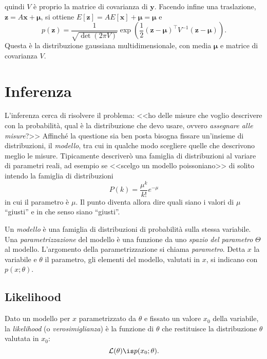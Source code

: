 %
quindi $V$ è proprio la matrice di covarianza di $\mathbf y$. Facendo infine
una traslazione, $\mathbf z = A\mathbf x + \boldsymbol\mu$, si ottiene
$E[\mathbf z] = AE[\mathbf x] + \boldsymbol\mu = \boldsymbol\mu$ e
%
\begin{equation*}
    p(\mathbf z) = \frac1{\sqrt{\det(2\pi V)}}
    \exp\left(\frac12 (\mathbf z - \boldsymbol\mu)^\top
    V^{-1} (\mathbf z - \boldsymbol\mu)\right).
\end{equation*}
%
Questa è la distribuzione gaussiana multidimensionale, con media
$\boldsymbol\mu$ e matrice di covarianza $V$.

\chapter{Inferenza}
\label{sec:cap2}

L'inferenza cerca di risolvere il problema:
<<ho delle misure che voglio descrivere con la probabilità,
qual è la distribuzione che devo usare, ovvero \emph{assegnare alle misure}?>>
Affinché la questione sia ben posta bisogna fissare un'insieme di distribuzioni, il \emph{modello},
tra cui in qualche modo scegliere quelle che descrivono meglio le misure.
Tipicamente descriverò una famiglia di distribuzioni al variare di parametri reali,
ad esempio se <<scelgo un modello poissoniano>> di solito intendo la famiglia di distribuzioni
\begin{equation*}
	P(k) = \frac{\mu^k}{k!}e^{-\mu}
\end{equation*}
in cui il parametro è $\mu$.
Il punto diventa allora dire quali siano i valori di $\mu$ ``giusti'' e in che senso siano ``giusti''.

\begin{definition}[Modello]
	Un \emph{modello} è una famiglia di distribuzioni di probabilità sulla stessa variabile.
	Una \emph{parametrizzazione} del modello è una funzione
	da uno \emph{spazio del parametro} $\Theta$
	al modello.
	L'argomento della parametrizzazione si chiama \emph{parametro}.
	Detta $x$ la variabile e $\theta$ il parametro,
	gli elementi del modello, valutati in $x$, si indicano con $p(x;\theta)$.
\end{definition}

\section{Likelihood}

\begin{definition}[Likelihood]
	Dato un modello per $x$ parametrizzato da $\theta$
	e fissato un valore $x_0$ della variabile,
	la \emph{likelihood} (o \emph{verosimiglianza}) è la funzione di $\theta$
	che restituisce la distribuzione $\theta$ valutata in $x_0$:
	\begin{equation*}
		\mathcal L(\theta) \is p(x_0;\theta).
	\end{equation*}
\end{definition}

